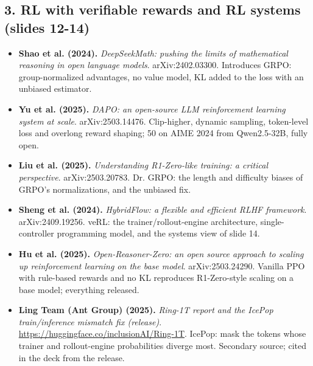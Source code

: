 \documentclass[11pt,letterpaper]{article}
\begin{document}
\subsection*{3. RL with verifiable rewards and RL systems (slides 12-14)}
\begin{itemize}[leftmargin=1.2em,itemsep=3pt]\sloppy
\item \textbf{Shao et al. (2024).} \textit{DeepSeekMath: pushing the limits of mathematical reasoning in open language models}. arXiv:2402.03300. Introduces GRPO: group-normalized advantages, no value model, KL added to the loss with an unbiased estimator.
\item \textbf{Yu et al. (2025).} \textit{DAPO: an open-source LLM reinforcement learning system at scale}. arXiv:2503.14476. Clip-higher, dynamic sampling, token-level loss and overlong reward shaping; 50 on AIME 2024 from Qwen2.5-32B, fully open.
\item \textbf{Liu et al. (2025).} \textit{Understanding R1-Zero-like training: a critical perspective}. arXiv:2503.20783. Dr. GRPO: the length and difficulty biases of GRPO's normalizations, and the unbiased fix.
\item \textbf{Sheng et al. (2024).} \textit{HybridFlow: a flexible and efficient RLHF framework}. arXiv:2409.19256. veRL: the trainer/rollout-engine architecture, single-controller programming model, and the systems view of slide 14.
\item \textbf{Hu et al. (2025).} \textit{Open-Reasoner-Zero: an open source approach to scaling up reinforcement learning on the base model}. arXiv:2503.24290. Vanilla PPO with rule-based rewards and no KL reproduces R1-Zero-style scaling on a base model; everything released.
\item \textbf{Ling Team (Ant Group) (2025).} \textit{Ring-1T report and the IcePop train/inference mismatch fix (release)}. \url{https://huggingface.co/inclusionAI/Ring-1T}. IcePop: mask the tokens whose trainer and rollout-engine probabilities diverge most. Secondary source; cited in the deck from the release.
\end{itemize}
\end{document}
